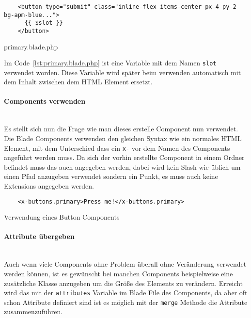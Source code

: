 \begin{listing}[H]
  \begin{verbatim}
    <button type="submit" class="inline-flex items-center px-4 py-2 bg-apm-blue...">
      {{ $slot }}
    </button>
  \end{verbatim}
  \caption{primary.blade.php}
  \label{lst:primary.blade.php}
\end{listing}


Im Code~\ref{lst:primary.blade.php} ist eine Variable mit dem Namen \verb|slot|
verwendet worden. Diese Variable wird später beim verwenden automatisch mit dem
Inhalt zwischen dem HTML Element ersetzt.


\paragraph{Components verwenden}\mbox{}\\

Es stellt sich nun die Frage wie man dieses erstelle Component nun verwendet.
Die Blade Components verwenden den gleichen Syntax wie ein normales HTML
Element, mit dem Unterschied dass ein \verb|x-| vor dem Namen des Components
angeführt werden muss. Da sich der vorhin erstellte Component in einem Ordner befindet muss das auch
angegeben werden, dabei wird kein Slash wie üblich um einen Pfad anzugeben
verwendet sondern ein Punkt, es muss auch keine Extensions angegeben werden.

\begin{listing}[H]
  \begin{verbatim}
    <x-buttons.primary>Press me!</x-buttons.primary>
  \end{verbatim}
  \caption{Verwendung eines Button Components}
\end{listing}


\paragraph{Attribute übergeben}\mbox{}\\

Auch wenn viele Components ohne Problem überall ohne Veränderung verwendet
werden können, ist es gewünscht bei manchen Components beispielweise eine
zusätzliche Klasse anzugeben um die Größe des Elements zu verändern. Erreicht
wird das mit der \verb|attributes| Variable im Blade File des Components, da
aber oft schon Attribute definiert sind ist es möglich mit der \verb|merge|
Methode die Attribute zusammenzuführen.


